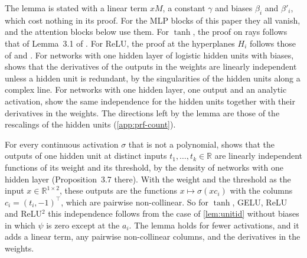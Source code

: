 \documentclass[10pt]{article}
\theoremstyle{definition}
\theoremstyle{remark}
\newcommand{\R}{\mathbb{R}}
\begin{document}
The lemma is stated with a linear term $xM$, a constant $\gamma$ and biases $\beta_i$ and $\beta'_i$, which cost nothing in its proof. For the MLP blocks of this paper they all vanish, and the attention blocks below use them. For $\tanh$, the proof on rays follows that of Lemma~3.1 of \citet{sussmann1992}. For ReLU, the proof at the hyperplanes $H_i$ follows those of \citet[Lemma~2]{petzka2020symmetries} and \citet[Theorem~6]{stock2021embedding}. For networks with one hidden layer of logistic hidden units with biases, \citet{fukumizu1995active} shows that the derivatives of the outputs in the weights are linearly independent unless a hidden unit is redundant, by the singularities of the hidden units along a complex line. For networks with one hidden layer, one output and an analytic activation, \citet[Corollary~3.2 and Remark~3]{luo2023geometry} show the same independence for the hidden units together with their derivatives in the weights. The directions left by the lemma are those of the rescalings of the hidden units (\cref{app:prf-count}).

For every continuous activation $\sigma$ that is not a polynomial, \citet[proof of Theorem~5.1]{pinkus1999approximation} shows that the outputs of one hidden unit at distinct inputs $t_1, \dots, t_k \in \R$ are linearly independent functions of its weight and its threshold, by the density of networks with one hidden layer (Proposition~3.7 there). With the weight and the threshold as the input $x \in \R^{1\times2}$, these outputs are the functions $x \mapsto \sigma(xc_i)$ with the columns $c_i = (t_i, -1)^\top$, which are pairwise non-collinear. So for $\tanh$, GELU, ReLU and ReLU$^2$ this independence follows from the case of \cref{lem:unitid} without biases in which $\psi$ is zero except at the $a_i$. The lemma holds for fewer activations, and it adds a linear term, any pairwise non-collinear columns, and the derivatives in the weights.
\end{document}
